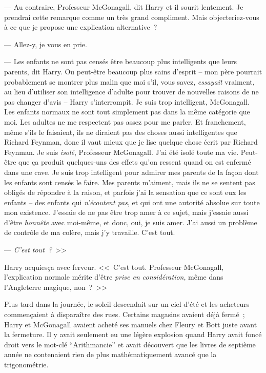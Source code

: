 --- Au contraire, Professeur McGonagall, dit Harry et il sourit lentement. Je prendrai cette remarque comme un très grand compliment. Mais objecteriez-vous à ce que je propose une explication alternative~?

--- Allez-y, je vous en prie.

--- Les enfants ne sont pas censés être beaucoup plus intelligents que leurs parents, dit Harry. Ou peut-être beaucoup plus sains d'esprit -- mon père pourrait probablement se montrer plus malin que moi s'il, vous savez, \emph{essayait} vraiment, au lieu d'utiliser son intelligence d'adulte pour trouver de nouvelles raisons de ne pas changer d'avis -- Harry s'interrompit. Je suis trop intelligent, McGonagall. Les enfants normaux ne sont tout simplement pas dans la même catégorie que moi. Les adultes ne me respectent pas assez pour me parler. Et franchement, même s'ils le faisaient, ils ne diraient pas des choses aussi intelligentes que Richard Feynman, donc il vaut mieux que je lise quelque chose écrit par Richard Feynman. Je suis \emph{isolé}, Professeur McGonagall. J'ai été isolé toute ma vie. Peut-être que ça produit quelques-uns des effets qu'on ressent quand on est enfermé dans une cave. Je suis trop intelligent pour admirer mes parents de la façon dont les enfants sont censés le faire. Mes parents m'aiment, mais ils ne se sentent pas obligés de répondre à la raison, et parfois j'ai la sensation que ce sont eux les enfants -- des enfants qui \emph{n'écoutent pas}, et qui ont une autorité absolue sur toute mon existence. J'essaie de ne pas être trop amer à ce sujet, mais j'essaie aussi d'être \emph{honnête} avec moi-même, et donc, oui, je suis amer. J'ai aussi un problème de contrôle de ma colère, mais j'y travaille. C'est tout.

--- \emph{C'est tout~?}~>>

Harry acquiesça avec ferveur. <<~C'est tout. Professeur McGonagall, l'explication normale mérite d'être \emph{prise en considération}, même dans l'Angleterre magique, non~?~>>

\later

Plus tard dans la journée, le soleil descendait sur un ciel d'été et les acheteurs commençaient à disparaître des rues. Certains magasins avaient déjà fermé~; Harry et McGonagall avaient acheté ses manuels chez Fleury et Bott juste avant la fermeture. Il y avait seulement eu une légère explosion quand Harry avait foncé droit vers le mot-clé “Arithmancie” et avait découvert que les livres de septième année ne contenaient rien de plus mathématiquement avancé que la trigonométrie.

